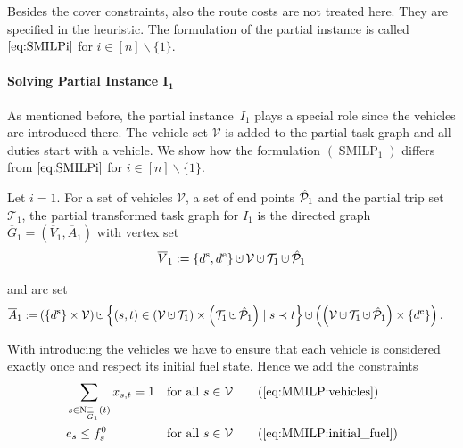 Besides the cover constraints, also the route costs are not treated here. They are specified in the heuristic. The formulation of the partial instance is called $\eqref{eq:SMILPi}$ for ${i\in[n]\backslash\{1\}}$.

\paragraph{Solving Partial Instance $\boldsymbol{I_1}$} \parfill

As mentioned before, the partial instance~$I_1$ plays a special role since the vehicles are introduced there. The vehicle set $\mathcal{V}$ is added to the partial task graph and all duties start with a vehicle. We show how the formulation $(\operatorname{SMILP}_1)$ differs from $\eqref{eq:SMILPi}$ for ${i\in[n]\backslash\{1\}}$.

\begin{definition}

Let $i=1$. For a set of vehicles $\mathcal{V}$, a set of end points $\hat{\mathcal{P}}_1$ and the partial trip set $\mathcal{T}_1$, the partial transformed task graph for $I_1$ is the directed graph $\overline{G}_1=\left(\overline{V}_1,\overline{A}_1\right)$ with vertex set
\begin{align*}
	\overline{V}_1 := \left\{\ds,\de\right\}\cupdot\mathcal{V}\cupdot\mathcal{T}_1\cupdot\Phat_1
\end{align*}

and arc set
\begin{align*}
	\overline{A}_1 := & \left(\left\{\ds\right\}\times\mathcal{V}\right)\cupdot\left\{(s,t)\in\left(\mathcal{V}\cupdot\mathcal{T}_1\right)\times\left(\mathcal{T}_1\cupdot\Phat_1\right)\mid s\prec t\right\} \cupdot\left(\left(\mathcal{V}\cupdot\mathcal{T}_1\cupdot\Phat_1\right)\times\left\{\de\right\}\right).
\end{align*}

\end{definition}

With introducing the vehicles we have to ensure that each vehicle is considered exactly once and respect its initial fuel state. Hence we add the constraints
\begin{align}
	& \sum_{s\in\operatorname{N}^-_{\overline{G}_1}(t)} x_{s,t} = 1 && \text{for all } s\in\mathcal{V} \tag{\ref{eq:MMILP:vehicles}} \\
	& e_s \leq f^0_s && \text{for all } s\in\mathcal{V} \tag{\ref{eq:MMILP:initial_fuel}}
\end{align}

